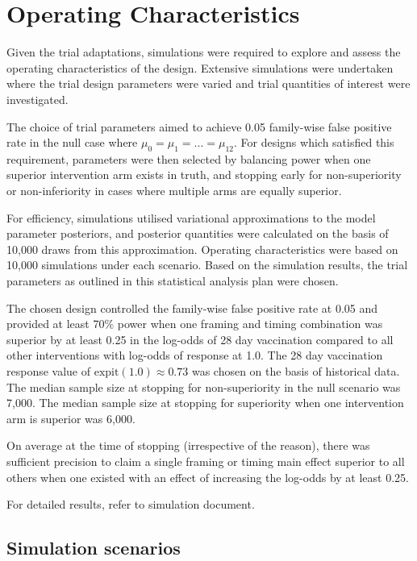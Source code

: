 \documentclass[
  bibliography=totoc]{scrreprt}
\begin{document}
\hypertarget{operating-characteristics}{%
\chapter{Operating Characteristics}\label{operating-characteristics}}

Given the trial adaptations, simulations were required to explore and assess the operating characteristics of the design.
Extensive simulations were undertaken where the trial design parameters were varied and trial quantities of interest were investigated.

The choice of trial parameters aimed to achieve 0.05 family-wise false positive rate in the null case where \(\mu_0 = \mu_1 = ... = \mu_{12}\).
For designs which satisfied this requirement, parameters were then selected by balancing power when one superior intervention arm exists in truth, and stopping early for non-superiority or non-inferiority in cases where multiple arms are equally superior.

For efficiency, simulations utilised variational approximations to the model parameter posteriors, and posterior quantities were calculated on the basis of 10,000 draws from this approximation. Operating characteristics were based on 10,000 simulations under each scenario.
Based on the simulation results, the trial parameters as outlined in this statistical analysis plan were chosen.

The chosen design controlled the family-wise false positive rate at 0.05 and provided at least 70\% power when one framing and timing combination was superior by at least 0.25 in the log-odds of 28 day vaccination compared to all other interventions with log-odds of response at 1.0.
The 28 day vaccination response value of \(\text{expit}(1.0)\approx 0.73\) was chosen on the basis of historical data.
The median sample size at stopping for non-superiority in the null scenario was 7,000.
The median sample size at stopping for superiority when one intervention arm is superior was 6,000.

On average at the time of stopping (irrespective of the reason), there was sufficient precision to claim a single framing or timing main effect superior to all others when one existed with an effect of increasing the log-odds by at least 0.25.

For detailed results, refer to simulation document.

\hypertarget{simulation-scenarios}{%
\section{Simulation scenarios}\label{simulation-scenarios}}
\end{document}
